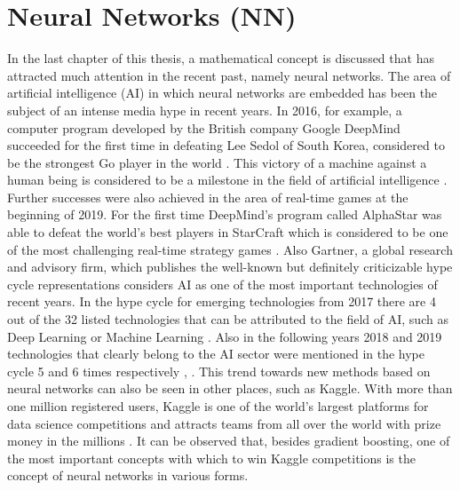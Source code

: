 

\chapter{Neural Networks (NN)}
\label{cha:NN}

In the last chapter of this thesis, a mathematical concept is discussed that has attracted much attention in the recent past, namely neural networks. The area of artificial intelligence (AI) in which neural networks are embedded has been the subject of an intense media hype in recent years. In 2016, for example, a computer program developed by the British company Google DeepMind succeeded for the first time in defeating Lee Sedol of South Korea, considered to be the strongest Go player in the world \cite{wiki_01}. This victory of a machine against a human being is considered to be a milestone in the field of artificial intelligence \cite{LA_Times}. Further successes were also achieved in the area of real-time games at the beginning of 2019. For the first time DeepMind's program called AlphaStar was able to defeat the world's best players in StarCraft which is considered to be one of the most challenging real-time strategy games \cite{AlphaStar}. Also Gartner, a global research and advisory firm, which publishes the well-known but definitely criticizable hype cycle representations considers AI as one of the most important technologies of recent years. In the hype cycle for emerging technologies from 2017 there are 4 out of the 32 listed technologies that can be attributed to the field of AI, such as Deep Learning or Machine Learning \cite{Gartner2017}. Also in the following years 2018 and 2019 technologies that clearly belong to the AI sector were mentioned in the hype cycle 5 and 6 times respectively \cite{Gartner2018}, \cite{Gartner2019}. This trend towards new methods based on neural networks can also be seen in other places, such as Kaggle. With more than one million registered users, Kaggle is one of the world's largest platforms for data science competitions and attracts teams from all over the world with prize money in the millions \cite{Kaggle}. It can be observed that, besides gradient boosting, one of the most important concepts with which to win Kaggle competitions is the concept of neural networks in various forms.   

